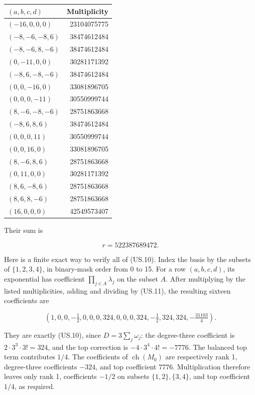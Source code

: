 \begin{longtable}[]{@{}lr@{}}
\toprule\noalign{}
\((a,b,c,d)\) & Multiplicity \\
\midrule\noalign{}
\endhead
\bottomrule\noalign{}
\endlastfoot
\((-16,0,0,0)\) & 23104075775 \\
\((-8,-6,-8,6)\) & 38474612484 \\
\((-8,-6,8,-6)\) & 38474612484 \\
\((0,-11,0,0)\) & 30281171392 \\
\((-8,6,-8,-6)\) & 38474612484 \\
\((0,0,-16,0)\) & 33081896705 \\
\((0,0,0,-11)\) & 30550999744 \\
\((8,-6,-8,-6)\) & 28751863668 \\
\((-8,6,8,6)\) & 38474612484 \\
\((0,0,0,11)\) & 30550999744 \\
\((0,0,16,0)\) & 33081896705 \\
\((8,-6,8,6)\) & 28751863668 \\
\((0,11,0,0)\) & 30281171392 \\
\((8,6,-8,6)\) & 28751863668 \\
\((8,6,8,-6)\) & 28751863668 \\
\((16,0,0,0)\) & 42549573407 \\
\end{longtable}

Their sum is

\[
 r=522387689472.
 \tag{US.11}
\]

Here is a finite exact way to verify all of (US.10). Index the basis by
the subsets of \(\{1,2,3,4\}\), in binary-mask order from 0 to 15. For a
row \((a,b,c,d)\), its exponential has coefficient
\(\prod_{j\in A}\lambda_j\) on the subset \(A\). After multiplying by
the listed multiplicities, adding and dividing by (US.11), the resulting
sixteen coefficients are

\[
 (1,0,0,-\tfrac12,0,0,0,324,0,0,0,324,-\tfrac12,324,324,
       -\tfrac{31103}{4}).
 \tag{US.12}
\]

They are exactly (US.10), since \(D=3\sum_j\omega_j\): the degree-three
coefficient is \(2\cdot3^3\cdot3!=324\), and the top correction is
\(-4\cdot3^4\cdot4!=-7776\). The balanced top term contributes \(1/4\).
The coefficients of \(\operatorname{ch}(M_0)\) are respectively rank 1,
degree-three coefficients \(-324\), and top coefficient \(7776\).
Multiplication therefore leaves only rank 1, coefficients \(-1/2\) on
subsets \(\{1,2\},\{3,4\}\), and top coefficient \(1/4\), as required.

